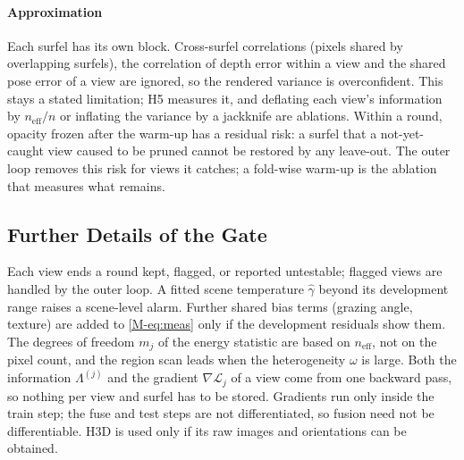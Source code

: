 \paragraph{Approximation}
Each surfel has its own block. Cross-surfel correlations (pixels shared by overlapping surfels), the
correlation of depth error within a view and the shared pose error of a view are ignored, so the
rendered variance is overconfident. This stays a stated limitation; H5 measures it, and deflating each
view's information by $n_{\mathrm{eff}}/n$ or inflating the variance by a jackknife are ablations.
Within a round, opacity frozen after the warm-up has a residual risk: a surfel that a not-yet-caught view
caused to be pruned cannot be restored by any leave-out. The outer loop removes this risk for views it
catches; a fold-wise warm-up is the ablation that measures what remains.

\subsection{Further Details of the Gate}
Each view ends a round kept, flagged, or reported untestable; flagged views are handled by the outer loop.
A fitted scene temperature $\hat\gamma$ beyond its development range raises a scene-level alarm. Further
shared bias terms (grazing angle, texture) are added to \eqref{M-eq:meas} only if the development residuals
show them. The degrees of freedom $m_j$ of the energy statistic are based on $n_{\mathrm{eff}}$, not on the
pixel count, and the region scan leads when the heterogeneity $\omega$ is large. Both the information
$\Lambda^{(j)}$ and the gradient $\nabla\mathcal{L}_j$ of a view come from one backward pass, so nothing per
view and surfel has to be stored. Gradients run only inside the train step; the fuse and test steps are not
differentiated, so fusion need not be differentiable. H3D \cite{data_h3d} is used only if its raw images and
orientations can be obtained.
